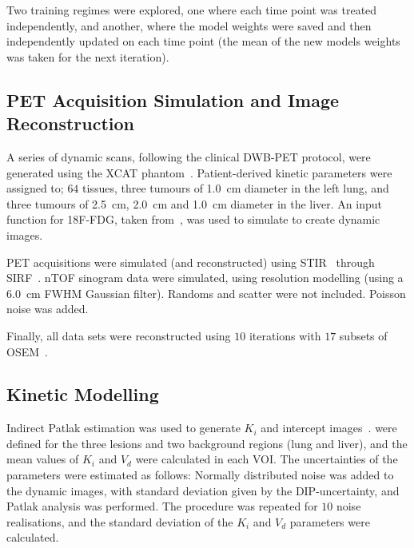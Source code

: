             Two training regimes were explored, one where each time point was treated independently, and another, where the model weights were saved and then independently updated on each time point (the mean of the new models weights was taken for the next iteration).
        
        \subsection{PET Acquisition Simulation and Image Reconstruction} \label{sec:pseudo_bayesian_dip_denoising_as_a_preprocessing_step_for_kinetic_modelling_in_dynamic_pet_appendix_methods_pet_acquisition_simulation_and_image_reconstruction}
            A series of dynamic scans, following the clinical \gls{DWB}-\gls{PET} protocol, were generated using the \gls{XCAT} phantom~\parencite{Segars2010}. Patient-derived kinetic parameters were assigned to; $64$ tissues, three tumours of \SI{1.0}{\centi\meter} diameter in the left lung, and three tumours of \SI{2.5}{\centi\meter}, \SI{2.0}{\centi\meter} and \SI{1.0}{\centi\meter} diameter in the liver. An input function for \gls{18F-FDG}, taken from~\parencite{Langsjo2004EffectsHumans}, was used to simulate  to create dynamic images.
    
            \gls{PET} acquisitions were simulated (and reconstructed) using \gls{STIR}~\parencite{Thielemans2012} through \gls{SIRF}~\parencite{Ovtchinnikov2017}. \gls{nTOF} sinogram data were simulated, using resolution modelling (using a \SI{6.0}{\centi\meter} \gls{FWHM} Gaussian filter). Randoms and scatter were not included. Poisson noise was added.%
    
            Finally, all data sets were reconstructed using $10$ iterations with $17$ subsets of \gls{OSEM}~\parencite{Hudson1994}.
        
        \subsection{Kinetic Modelling} \label{sec:pseudo_bayesian_dip_denoising_as_a_preprocessing_step_for_kinetic_modelling_in_dynamic_pet_appendix_methods_kinetic_modelling}
            Indirect Patlak estimation was used to generate $K_i$ and intercept images~\parencite{Patlak1983GraphicalData}.  were defined for the three lesions and two background regions (lung and liver), and the mean values of $K_i$ and $V_d$ were calculated in each \gls{VOI}. The uncertainties of the parameters were estimated as follows: Normally distributed noise was added to the dynamic images, with standard deviation given by the \gls{DIP}-uncertainty, and Patlak analysis was performed. The procedure was repeated for $10$ noise realisations, and the standard deviation of the $K_i$ and $V_d$ parameters were calculated.
        
